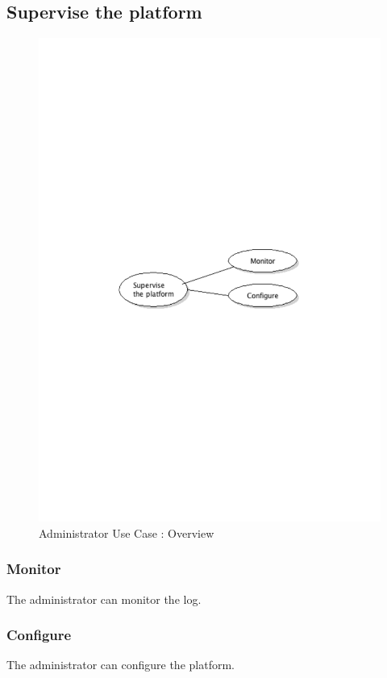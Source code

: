 	\subsection{Supervise the platform}
		\begin{figure}[ht]
			\begin{center}
				\includegraphics[width=\textwidth, trim=2cm 12cm 2cm 12cm]{UML_figure/UC/administrator/UC_Administrator_Supervise.pdf}
				\caption{Administrator Use Case : Overview}
			\end{center}
		\end{figure}
		\subsubsection{Monitor}
			The administrator can monitor the log.
		\subsubsection{Configure}
			The administrator can configure the platform.
\newpage
